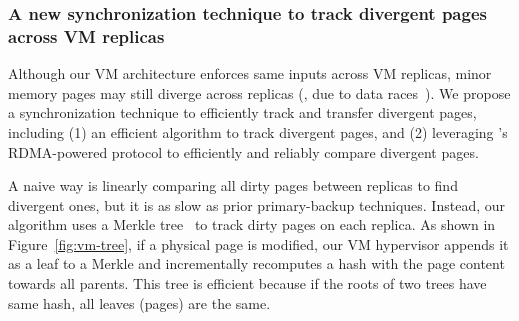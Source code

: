



\vspace{-.15in}\subsubsection{A new synchronization technique to 
track divergent pages across VM replicas}
\label{sec:tracking}\vspace{-.075in}



Although our VM architecture enforces same inputs across VM replicas, 
minor memory pages may still diverge across replicas (\eg, due to 
data races~\cite{lu:concurrency-bugs}). We propose a synchronization 
technique to efficiently track and transfer divergent pages, including (1) 
an efficient  algorithm to track divergent pages, and (2) 
leveraging \falcon's RDMA-powered protocol to efficiently and reliably compare 
divergent pages.

A naive way is linearly comparing all  dirty pages between replicas to 
find divergent ones, but it is as slow as prior primary-backup 
techniques. Instead, our algorithm uses a Merkle tree~\cite{eve:osdi12} to track 
dirty pages on each replica. As shown in Figure~\ref{fig:vm-tree}, if a 
physical page is modified, our VM hypervisor appends it as a leaf to a
Merkle and incrementally recomputes a  hash with the page content towards all 
parents. This tree is efficient because if the roots of two trees 
have same hash, all leaves (pages) are the same.

